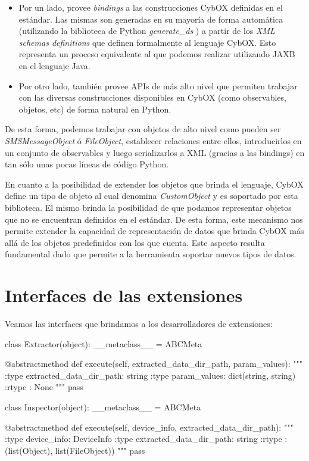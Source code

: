 \begin{itemize}
\item Por un lado, provee \emph{bindings} a las construcciones CybOX definidas en el estándar. Las mismas son generadas en su mayoría de forma automática (utilizando la biblioteca de Python \emph{generate\_ds} \cite{generateDS}) a partir de los \emph{XML schemas definitions} que definen formalmente al lenguaje CybOX. Esto representa un proceso equivalente al que podemos realizar utilizando JAXB \cite{JAXB} en el lenguaje Java.
\item Por otro lado, también provee APIs de más alto nivel que permiten trabajar con las diversas construcciones disponibles en CybOX (como observables, objetos, etc) de forma natural en Python.
\end{itemize}

De esta forma, podemos trabajar con objetos de alto nivel como pueden ser \emph{SMSMessageObject} ó \emph{FileObject}, establecer relaciones entre ellos, introducirlos en un conjunto de observables y luego serializarlos a XML (gracias a las bindings) en tan sólo unas pocas líneas de código Python.

En cuanto a la posibilidad de extender los objetos que brinda el lenguaje, CybOX define un tipo de objeto al cual denomina \emph{CustomObject} y es soportado por esta biblioteca. El mismo brinda la posibilidad de que podamos representar objetos que no se encuentran definidos en el estándar. De esta forma, este mecanismo nos permite extender la capacidad de representación de datos que brinda CybOX más allá de los objetos predefinidos con los que cuenta. Este aspecto resulta fundamental dado que permite a la herramienta soportar nuevos tipos de datos.

\section{Interfaces de las extensiones}
\label{interfacesDeExtension}
Veamos las interfaces que brindamos a los desarrolladores de extensiones:
\newline

\begin{python}[title=Interfaces brindadas a los desarrolladores, captionpos=b]
class Extractor(object):
    __metaclass__ = ABCMeta

    @abstractmethod
    def execute(self, extracted_data_dir_path, param_values):
        """
        :type extracted_data_dir_path: string
        :type param_values: dict(string, string)
        :rtype : None
        """
        pass

class Inspector(object):
    __metaclass__ = ABCMeta

    @abstractmethod
    def execute(self, device_info, extracted_data_dir_path):
        """
        :type device_info: DeviceInfo
        :type extracted_data_dir_path: string
        :rtype : (list(Object), list(FileObject))
        """
        pass

\end{python}

